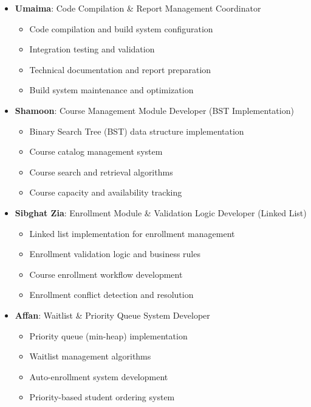 \documentclass[12pt,a4paper]{article}
\begin{document}
\begin{itemize}
    \item \textbf{Umaima}: Code Compilation \& Report Management Coordinator
    \begin{itemize}
        \item Code compilation and build system configuration
        \item Integration testing and validation
        \item Technical documentation and report preparation
        \item Build system maintenance and optimization
    \end{itemize}
    
    \item \textbf{Shamoon}: Course Management Module Developer (BST Implementation)
    \begin{itemize}
        \item Binary Search Tree (BST) data structure implementation
        \item Course catalog management system
        \item Course search and retrieval algorithms
        \item Course capacity and availability tracking
    \end{itemize}
    
    \item \textbf{Sibghat Zia}: Enrollment Module \& Validation Logic Developer (Linked List)
    \begin{itemize}
        \item Linked list implementation for enrollment management
        \item Enrollment validation logic and business rules
        \item Course enrollment workflow development
        \item Enrollment conflict detection and resolution
    \end{itemize}
    
    \item \textbf{Affan}: Waitlist \& Priority Queue System Developer
    \begin{itemize}
        \item Priority queue (min-heap) implementation
        \item Waitlist management algorithms
        \item Auto-enrollment system development
        \item Priority-based student ordering system
    \end{itemize}
    

\end{itemize}
\end{document}
